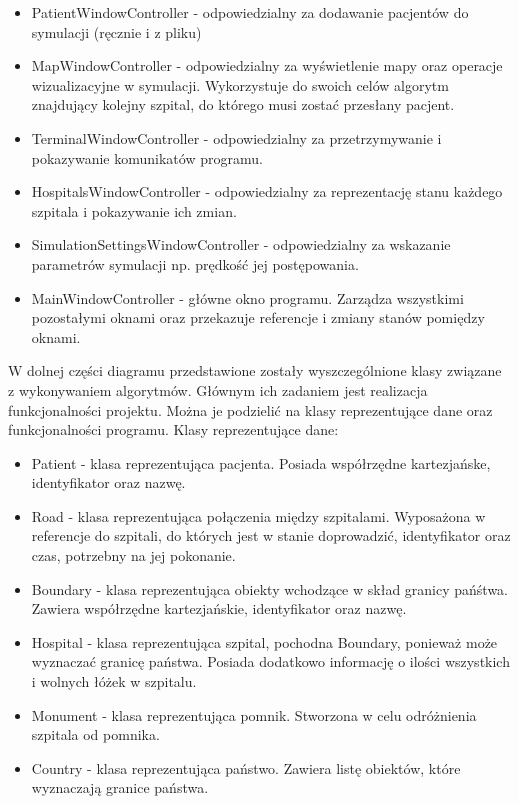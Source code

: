\documentclass[10pt,a4paper]{article}
\begin{document}
\begin{itemize}
    \item PatientWindowController - odpowiedzialny za dodawanie pacjentów do symulacji (ręcznie i z pliku)
    \item MapWindowController - odpowiedzialny za wyświetlenie mapy oraz operacje wizualizacyjne w symulacji. Wykorzystuje do swoich celów algorytm znajdujący kolejny szpital, do którego musi zostać przesłany pacjent.
    \item TerminalWindowController - odpowiedzialny za przetrzymywanie i pokazywanie komunikatów programu.
    \item HospitalsWindowController - odpowiedzialny za reprezentację stanu każdego szpitala i pokazywanie ich zmian.
    \item SimulationSettingsWindowController - odpowiedzialny za wskazanie parametrów symulacji np. prędkość jej postępowania.
    \item MainWindowController - główne okno programu. Zarządza wszystkimi pozostałymi oknami oraz przekazuje referencje i zmiany stanów pomiędzy oknami.
\end{itemize}
W dolnej części diagramu przedstawione zostały wyszczególnione klasy związane z wykonywaniem algorytmów.
Głównym ich zadaniem jest realizacja funkcjonalności projektu.
Można je podzielić na klasy reprezentujące dane oraz funkcjonalności programu.
Klasy reprezentujące dane:

\begin{itemize}
    \item Patient - klasa reprezentująca pacjenta. Posiada współrzędne kartezjańske, identyfikator oraz nazwę.
    \item Road - klasa reprezentująca połączenia między szpitalami. Wyposażona w referencje do szpitali, do których jest w stanie doprowadzić, identyfikator oraz czas, potrzebny na jej pokonanie.
    \item Boundary - klasa reprezentująca obiekty wchodzące w skład granicy pańśtwa. Zawiera współrzędne kartezjańskie, identyfikator oraz nazwę.
    \item Hospital - klasa reprezentująca szpital, pochodna Boundary, ponieważ może wyznaczać granicę państwa. Posiada dodatkowo informację o ilości wszystkich i wolnych łóżek w szpitalu.
    \item Monument - klasa reprezentująca pomnik. Stworzona w celu odróżnienia szpitala od pomnika.
    \item Country - klasa reprezentująca państwo. Zawiera listę obiektów, które wyznaczają granice państwa.

\end{itemize}
\end{document}
